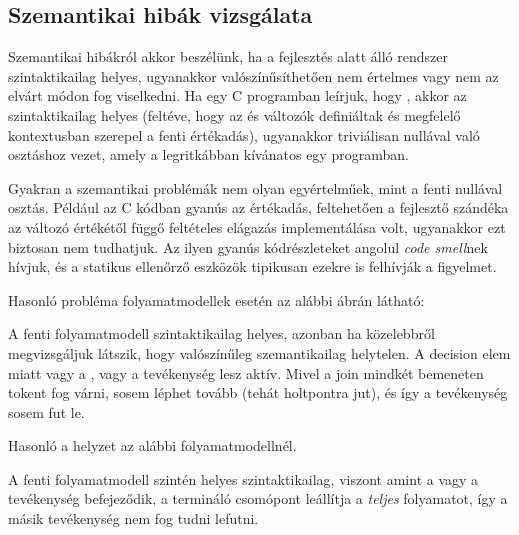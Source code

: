 \subsection{Szemantikai hibák vizsgálata}\label{sec:statikus-ellenorzes-szemantikai-hibak}

Szemantikai hibákról akkor beszélünk, ha a fejlesztés alatt álló rendszer szintaktikailag helyes, ugyanakkor valószínűsíthetően nem értelmes vagy nem az elvárt módon fog viselkedni. Ha egy C programban leírjuk, hogy , akkor az szintaktikailag helyes (feltéve, hogy az  és  változók definiáltak és megfelelő kontextusban szerepel a fenti értékadás), ugyanakkor triviálisan nullával való osztáshoz vezet, amely a legritkábban kívánatos egy programban. 

Gyakran a szemantikai problémák nem olyan egyértelműek, mint a fenti nullával osztás. Például az  C kódban gyanús az értékadás, feltehetően a fejlesztő szándéka az  változó értékétől függő feltételes elágazás implementálása volt, ugyanakkor ezt biztosan nem tudhatjuk. Az ilyen gyanús kódrészleteket angolul \emph{code smell}nek hívjuk, és a statikus ellenőrző eszközök tipikusan ezekre is felhívják a figyelmet.

Hasonló probléma folyamatmodellek esetén az alábbi ábrán látható:


A fenti folyamatmodell szintaktikailag helyes, azonban ha közelebbről megvizsgáljuk látszik, hogy valószínűleg szemantikailag helytelen. A decision elem miatt vagy a , vagy a  tevékenység lesz aktív. Mivel a join mindkét bemeneten tokent fog várni, sosem léphet tovább (tehát holtpontra jut), és így a  tevékenység sosem fut le.

Hasonló a helyzet az alábbi folyamatmodellnél.

A fenti folyamatmodell szintén helyes szintaktikailag, viszont amint a  vagy a  tevékenység befejeződik, a termináló csomópont leállítja a \emph{teljes} folyamatot, így a másik tevékenység nem fog tudni lefutni.

